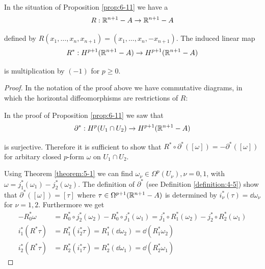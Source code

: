\begin{addendum}\label{addendum:6-12}
  In the situation of Proposition \ref{prop:6-11} we have a 
  \begin{align*}
    R:{\mathbb{R}}^{n+1}-A \to {\ensuremath{\mathbb{R}}}^{n+1}-A
  \end{align*}

  defined by $R(x_1, \ldots, x_n, x_{n+1}) = (x_1, \ldots, x_n, -x_{n+1})$. The induced linear map
  \begin{align*}
    R^*:H^{p+1}({\mathbb{R}}^{n+1} -A) \to H^{p+1}({\mathbb{R}}^{n+1} - A)
  \end{align*}

  is multiplication by $(-1)$ for $p\ge 0$.
\end{addendum}

\begin{proof}
  In the notation of the proof above we have commutative diagrams, in
which the horizontal diffeomorphisms are restrictions of $R$:
\begin{center}
  \hspace*{3em}
\end{center}

In the proof of Proposition \ref{prop:6-11} we saw that
\begin{align*}
  \partial^*:H^p(U_1\cap U_2)\to H^{p+1}({\mathbb{R}}^{n+1}-A)
\end{align*}

is surjective. Therefore it is sufficient to show that $R^*\circ\partial^*([\omega]) = -\partial^*([\omega])$
for arbitary closed $p$-form $\omega$ on $U_1\cap U_2$.

Using Theorem \ref{theorem:5-1} we can find $\omega_\nu\in\Omega^p(U_\nu),\nu=0,1$, with $\omega=j_1^*(\omega_1) -
j_2^*(\omega_2)$. The definition of $\partial^*$ (see Definition \ref{definition:4-5}) show that $\partial^*([\omega]) = [\tau]$
where $\tau\in\Omega^{p+1}({\mathbb{R}}^{n+1} - A)$ is determined by $i^*_\nu(\tau) = \dd\omega_\nu$ for $\nu=1, 2$. Furthermore we get 
\begin{align*}
  -R^*_0\omega & = R^*_0\circ j^*_2(\omega_2) - R^*_0\circ j^*_1(\omega_1) 
      = j^*_1\circ R^*_1(\omega_2) - j^*_2\circ R^*_2(\omega_1) \\
  i^*_1(R^*\tau) & = R^*_1(i^*_2\tau) = R^*_1(\!\dd\omega_2) = \dd(R^*_1\omega_2) \\
  i^*_2(R^*\tau) & = R^*_2(i^*_1\tau) = R^*_2(\!\dd\omega_1) = \dd(R^*_2\omega_1)
\end{align*}


\end{proof}
